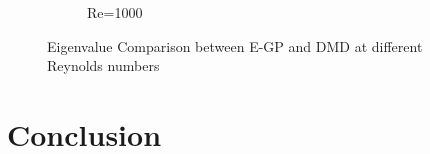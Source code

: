 \documentclass[letterpaper,12pt,peerreviewca,draftcls]{IEEEtran}
\begin{document}
\begin{figure}[!h]
\begin{subfigure}[t]{0.48\textwidth}
		\caption{Re=1000}
	\end{subfigure}
	
	\caption{Eigenvalue Comparison between E-GP and DMD at different Reynolds numbers}
	\label{fig:eigenvalues}
\end{figure}








%

\section{Conclusion}\label{sec:conclusion}
\end{document}
